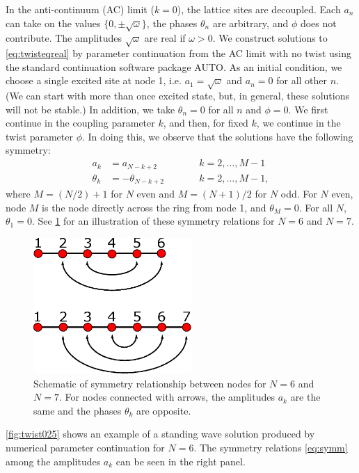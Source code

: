 \documentclass[reprint, amsmath,amssymb,aps]{revtex4-2}
\def\noi{\noindent}
\begin{document}
In the anti-continuum (AC) limit ($k = 0$), the lattice sites are decoupled. Each $a_n$ can take on the values $\{0, \pm \sqrt{\omega} \}$, the phases $\theta_n$ are arbitrary, and $\phi$ does not contribute. The amplitudes $\sqrt{\omega}$ are real if  $\omega > 0$. We construct solutions to \cref{eq:twisteqreal} by parameter continuation from the AC limit with no twist using the standard continuation software package AUTO. As an initial condition, we choose a single excited site at node 1, i.e. $a_1 = \sqrt{\omega}$ and $a_n = 0$ for all other $n$. (We can start with more than once excited state, but, in general, these solutions will not be stable.) In addition, we take $\theta_n = 0$ for all $n$ and $\phi = 0$.  We first continue in the coupling parameter $k$, and then, for fixed $k$, we continue in the twist parameter $\phi$. In doing this, we observe that the solutions have the following symmetry:
\begin{equation}\label{eq:symm}
\begin{aligned}
a_k &= a_{N-k+2} && \qquad k = 2, \dots, M-1 \\
\theta_k &= -\theta_{N-k+2} && \qquad k = 2, \dots, M-1,
\end{aligned}
\end{equation}
where $M = (N/2)+1$ for $N$ even and $M = (N+1)/2$ for $N$ odd. For $N$ even, node $M$ is the node directly across the ring from node 1, and $\theta_M = 0$. For all $N$, $\theta_1 = 0$. See \cref{fig:symmetry1} for an illustration of these symmetry relations for $N = 6$ and $N = 7$. 
\begin{figure}
\begin{center}
\includegraphics[width=6cm]{symmetryvertical.eps}
\end{center}
\caption{Schematic of symmetry relationship between nodes for $N = 6$ and $N=7$. For nodes connected with arrows, the amplitudes $a_k$ are the same and the phases $\theta_k$ are opposite.}
\label{fig:symmetry1}
\end{figure}
\noi \cref{fig:twist025} shows an example of a standing wave solution produced by numerical parameter continuation for $N = 6$. The symmetry relations \cref{eq:symm} among the amplitudes $a_k$ can be seen in the right panel.
\end{document}

